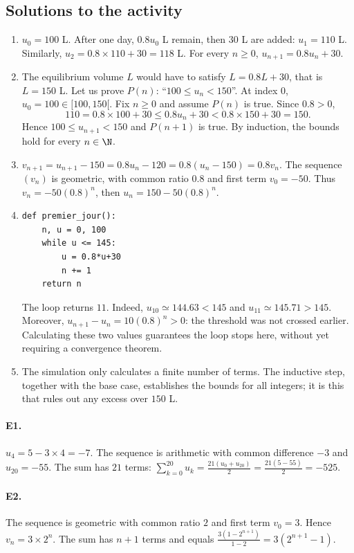 \subsection{Solutions to the activity}\begin{enumerate}
\item $u_0=100$ L. After one day, $0.8u_0$ L remain, then $30$ L are added: $u_1=110$ L. Similarly, $u_2=0.8\times110+30=118$ L. For every $n\ge0$, $u_{n+1}=0.8u_n+30$.
\item The equilibrium volume $L$ would have to satisfy $L=0.8L+30$, that is $L=150$ L. Let us prove $P(n)$: ``$100\le u_n<150$''. At index $0$, $u_0=100\in[100,150[$. Fix $n\ge0$ and assume $P(n)$ is true. Since $0.8>0$,
\[110=0.8\times100+30\le0.8u_n+30<0.8\times150+30=150.\]
Hence $100\le u_{n+1}<150$ and $P(n+1)$ is true. By induction, the bounds hold for every $n\in\N$.
\item $v_{n+1}=u_{n+1}-150=0.8u_n-120=0.8(u_n-150)=0.8v_n$. The sequence $(v_n)$ is geometric, with common ratio $0.8$ and first term $v_0=-50$. Thus $v_n=-50(0.8)^n$, then $u_n=150-50(0.8)^n$.
\item 
\begin{lstlisting}
def premier_jour():
    n, u = 0, 100
    while u <= 145:
        u = 0.8*u+30
        n += 1
    return n
\end{lstlisting}
The loop returns $11$. Indeed, $u_{10}\simeq144.63<145$ and $u_{11}\simeq145.71>145$. Moreover, $u_{n+1}-u_n=10(0.8)^n>0$: the threshold was not crossed earlier. Calculating these two values guarantees the loop stops here, without yet requiring a convergence theorem.
\item The simulation only calculates a finite number of terms. The inductive step, together with the base case, establishes the bounds for all integers; it is this that rules out any excess over $150$ L.
\end{enumerate}

\paragraph{E1.}$u_4=5-3\times4=-7$. The sequence is arithmetic with common difference $-3$ and $u_{20}=-55$. The sum has $21$ terms: $\sum_{k=0}^{20}u_k=\frac{21(u_0+u_{20})}{2}=\frac{21(5-55)}{2}=-525$.

\paragraph{E2.}The sequence is geometric with common ratio $2$ and first term $v_0=3$. Hence $v_n=3\times2^n$. The sum has $n+1$ terms and equals $\frac{3(1-2^{n+1})}{1-2}=3(2^{n+1}-1)$.

